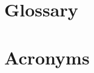 
\begin{appendices}
\renewcommand{\thesection}{\Roman{section}}
\section{Glossary}
\printglossary
\newpage
\section{Acronyms}
\printglossary[type=\acronymtype]
\newpage
\begin{landscape}

\end{landscape}
\end{appendices}
